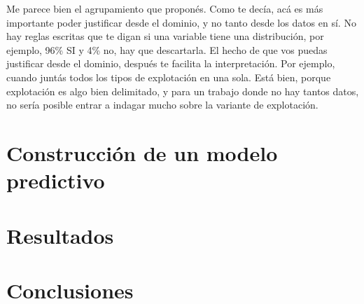 \documentclass[10 pt]{article}
\begin{document}
Me parece bien el agrupamiento que proponés. Como te decía, acá es más importante poder justificar desde el dominio, y no tanto desde los datos en sí. No hay reglas escritas que te digan si una variable tiene una distribución, por ejemplo, 96\% SI y 4\% no, hay que descartarla.
El hecho de que vos puedas justificar desde el dominio, después te facilita la interpretación. Por ejemplo, cuando juntás todos los tipos de explotación en una sola. Está bien, porque explotación es algo bien delimitado, y para un trabajo donde no hay tantos datos, no sería posible entrar a indagar mucho sobre la variante de explotación.








\section{Construcción de un modelo predictivo}\label{pred}


\section{Resultados}\label{res}

\section{Conclusiones}\label{conc}






\newpage


\end{document}
